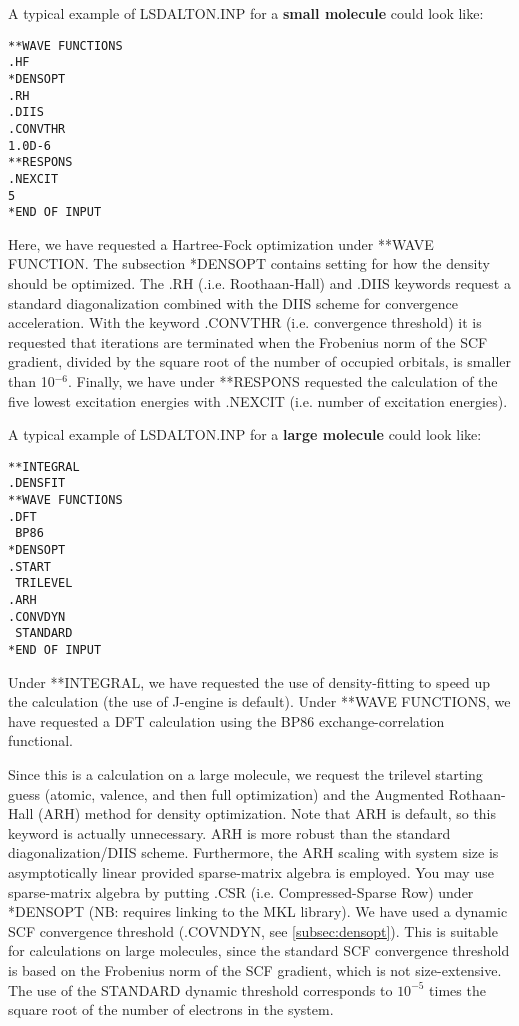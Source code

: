 A typical example of LSDALTON.INP for a {\bf small molecule} could look like:
\begin{verbatim}
**WAVE FUNCTIONS
.HF
*DENSOPT
.RH
.DIIS
.CONVTHR
1.0D-6
**RESPONS
.NEXCIT
5
*END OF INPUT
\end{verbatim}
Here, we have requested a Hartree-Fock optimization under **WAVE FUNCTION. The subsection
*DENSOPT contains setting for how the density should be optimized. The .RH (.i.e. Roothaan-Hall)
and .DIIS keywords request a standard diagonalization combined with the DIIS scheme for convergence
acceleration. With the keyword .CONVTHR (i.e. convergence threshold) 
it is requested that iterations are terminated when the 
Frobenius norm of the SCF gradient, divided by the square root of the number of occupied orbitals, 
is smaller than 10$^{-6}$. Finally, we have under **RESPONS requested
the calculation of the five lowest excitation energies with .NEXCIT (i.e. number of excitation energies).

A typical example of LSDALTON.INP for a {\bf large molecule} could look like: 
\begin{verbatim}
**INTEGRAL
.DENSFIT
**WAVE FUNCTIONS
.DFT
 BP86
*DENSOPT
.START
 TRILEVEL
.ARH
.CONVDYN
 STANDARD
*END OF INPUT
\end{verbatim}
Under **INTEGRAL, we have requested the use of density-fitting to speed up the calculation (the use of J-engine is default). 
Under **WAVE FUNCTIONS, we have requested a DFT
calculation using the BP86 exchange-correlation functional.

Since this is a calculation on a large molecule, 
we request the trilevel starting guess (atomic, valence, and then full
optimization) and the Augmented Rothaan-Hall (ARH) method for density optimization. 
Note that ARH is default, so this keyword is actually unnecessary.
ARH is more robust than the standard diagonalization/DIIS scheme. 
Furthermore, the ARH scaling with system size is asymptotically linear 
provided sparse-matrix algebra is employed. You may use sparse-matrix algebra by 
putting .CSR (i.e. Compressed-Sparse Row) under *DENSOPT (NB: requires linking 
to the MKL library). 
We have used a dynamic SCF convergence threshold (.COVNDYN, see \ref{subsec:densopt}). This is suitable for calculations on large molecules, since the standard SCF
convergence threshold is based on the Frobenius norm of the SCF gradient, which is not size-extensive.
The use of the STANDARD dynamic threshold corresponds to  $10^{-5}$ times the square root of the number of electrons in the system.


